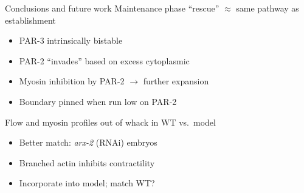 \documentclass{beamer}
\newcommand{\6}[1]{#1_{\text{6}}}
\newcommand{\3}[1]{#1_{\text{3}}}
\begin{document}
\begin{frame}{Conclusions and future work}
Maintenance phase ``rescue'' $\approx$ same pathway as establishment
\begin{itemize}
\item PAR-3 intrinsically bistable
\item PAR-2 ``invades'' based on excess cytoplasmic
\item Myosin inhibition by PAR-2 $\rightarrow$ further expansion
\item Boundary pinned when run low on PAR-2
\end{itemize}
Flow and myosin profiles out of whack in WT vs.\ model
\begin{itemize}
\item Better match: \emph{arx-2} (RNAi) embryos 
\item Branched actin inhibits contractility
\item Incorporate into model; match WT?
\end{itemize} 
\end{frame}
\end{document}

